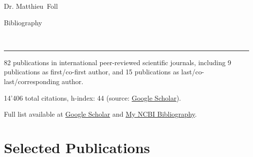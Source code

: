 \documentclass[10pt,a4paper]{article}
\newcommand{\Title}{Bibliography }
\newcommand{\FirstName}{Matthieu}
\newcommand{\LastName}{Foll}
\newcommand{\MyName}{Dr. \FirstName\ \LastName}
\begin{document}
\begin{minipage}[t]{0.5\textwidth}
  {\fontsize{20pt}{0}\selectfont\MyName}
\end{minipage}
\begin{minipage}[t]{0.5\textwidth}
  \begin{flushright}
    \Title{}
  \end{flushright}
\end{minipage}
\\[-0.1cm]
\textcolor{lightgray}{\rule{\textwidth}{3pt}}
\vspace{0.1cm}

82 publications in international peer-reviewed scientific journals, including 9 publications as first/co-first author, and 15 publications as last/co-last/corresponding author.

14'406 total citations, h-index: 44 (source: \href{https://scholar.google.com/citations?hl=en&user=vzZPQj8AAAAJ&view_op=list_works&sortby=pubdate}{Google Scholar}).

Full list available at \href{https://scholar.google.com/citations?hl=en&user=vzZPQj8AAAAJ&view_op=list_works&sortby=pubdate}{Google Scholar} and  \href{https://www.ncbi.nlm.nih.gov/myncbi/matthieu.foll.1/bibliography/public/}{My NCBI Bibliography}.

\section{Selected Publications}
\end{document}
